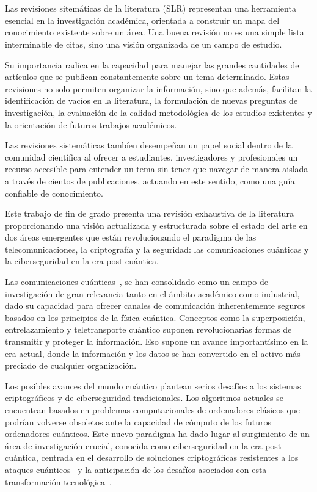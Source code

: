 \chapter{\introductionname}
Las revisiones sitemáticas de la literatura (SLR) representan una herramienta esencial en la investigación académica, orientada a construir un mapa del conocimiento existente sobre un área. Una buena revisión no es una simple lista interminable de citas, sino una visión organizada de un campo de estudio. 

Su importancia radica en la capacidad para manejar las grandes cantidades de artículos que se publican constantemente sobre un tema determinado. Estas revisiones no solo permiten organizar la información, sino que además, facilitan la identificación de vacíos en la literatura, la formulación de nuevas preguntas de investigación, la evaluación de la calidad metodológica de los estudios existentes y la orientación de futuros trabajos académicos.

Las revisiones sistemáticas tambíen desempeñan un papel social dentro de la comunidad científica al ofrecer a estudiantes, investigadores y profesionales un recurso accesible para entender un tema sin tener que navegar de manera aislada a través de cientos de publicaciones, actuando en este sentido, como una guía confiable de conocimiento.

Este trabajo de fin de grado presenta una revisión exhaustiva de la
literatura proporcionando una visión actualizada y estructurada sobre el estado
del arte en dos áreas emergentes que están revolucionando el paradigma de las telecomunicaciones, la criptografía y la seguridad: las comunicaciones cuánticas y la ciberseguridad en la era post-cuántica.

Las comunicaciones cuánticas~\cite{Singh2024}, se han consolidado como un campo de
investigación de gran relevancia tanto en el ámbito académico como industrial, dado su capacidad para ofrecer canales de comunicación inherentemente seguros
basados en los principios de la física cuántica. Conceptos como la
superposición, entrelazamiento y teletransporte cuántico suponen
revolucionarias formas de transmitir y proteger la información. Eso supone un
avance importantísimo en la era actual, donde la información y los datos se han convertido en el activo más preciado de cualquier organización.

Los posibles avances del mundo cuántico plantean serios desafíos a los
sistemas criptográficos y de ciberseguridad tradicionales. Los algoritmos actuales se encuentran basados en problemas computacionales de ordenadores clásicos que podrían volverse obsoletos ante la capacidad de cómputo de los futuros ordenadores cuánticos. Este nuevo paradigma ha dado lugar al surgimiento de un área de investigación crucial, conocida como ciberseguridad en la era post-cuántica, centrada en el desarrollo de soluciones criptográficas resistentes a los ataques cuánticos~\cite{Liu2024} y la anticipación de los desafíos asociados con esta transformación tecnológica~\cite{Hussain2024}.

